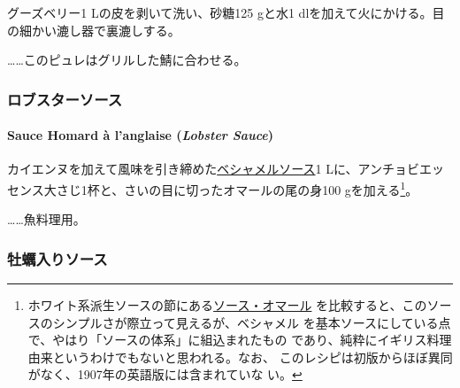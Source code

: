 \begin{recette}
グーズベリー1 Lの皮を剥いて洗い、砂糖125 gと水1
dlを加えて火にかける。目の細かい漉し器で裏漉しする。

\ldots{}\ldots{}このピュレはグリルした鯖に合わせる。

\maeaki

\hypertarget{ux30edux30d6ux30b9ux30bfux30fcux30bdux30fcux30b9}{%
\subsubsection{ロブスターソース}\label{ux30edux30d6ux30b9ux30bfux30fcux30bdux30fcux30b9}}

\hypertarget{lobster-sauce}{%
\paragraph{\texorpdfstring{Sauce Homard à l'anglaise (\emph{Lobster
Sauce})}{Sauce Homard à l'anglaise (Lobster Sauce)}}\label{lobster-sauce}}


カイエンヌを加えて風味を引き締めた\protect\hyperlink{sauce-bechamel}{ベシャメルソース}1
Lに、アンチョビエッセンス大さじ1杯と、さいの目に切ったオマールの尾の身100
gを加える\footnote{ホワイト系派生ソースの節にある\protect\hyperlink{sauce-homard}{ソース・オマール}
  を比較すると、このソースのシンプルさが際立って見えるが、ベシャメル
  を基本ソースにしている点で、やはり「ソースの体系」に組込まれたもの
  であり、純粋にイギリス料理由来というわけでもないと思われる。なお、
  このレシピは初版からほぼ異同がなく、1907年の英語版には含まれていな
  い。}。

\ldots{}\ldots{}魚料理用。

\maeaki

\hypertarget{ux7261ux8823ux5165ux308aux30bdux30fcux30b9}{%
\subsubsection{牡蠣入りソース}\label{ux7261ux8823ux5165ux308aux30bdux30fcux30b9}}


\end{recette}
